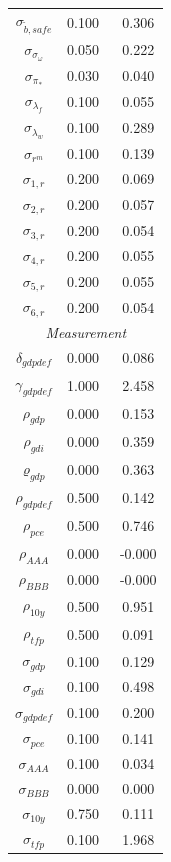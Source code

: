 \documentclass[12pt]{article}
\begin{document}
\begin{longtable}{ccc}
$ \sigma_{\tilde{b}, safe}$ &    0.100 & \   0.306 \\
$ \sigma_{\sigma_\omega}$ &    0.050 & \   0.222 \\
$ \sigma_{\pi_*}$ &    0.030 & \   0.040 \\
$ \sigma_{\lambda_f}$ &    0.100 & \   0.055 \\
$ \sigma_{\lambda_w}$ &    0.100 & \   0.289 \\
$ \sigma_{r^m}$ &    0.100 & \   0.139 \\
$ \sigma_{1,r}$ &    0.200 & \   0.069 \\
$ \sigma_{2,r}$ &    0.200 & \   0.057 \\
$ \sigma_{3,r}$ &    0.200 & \   0.054 \\
$ \sigma_{4,r}$ &    0.200 & \   0.055 \\
$ \sigma_{5,r}$ &    0.200 & \   0.055 \\
$ \sigma_{6,r}$ &    0.200 & \   0.054 \\
\multicolumn{7}{c}{\textit{Measurement}} \\[3pt]
$ \delta_{gdpdef}$ &    0.000 & \   0.086 \\
$ \gamma_{gdpdef}$ &    1.000 & \   2.458 \\
$ \rho_{gdp}$ &    0.000 & \   0.153 \\
$ \rho_{gdi}$ &    0.000 & \   0.359 \\
$ \varrho_{gdp}$ &    0.000 & \   0.363 \\
$ \rho_{gdpdef}$ &    0.500 & \   0.142 \\
$ \rho_{pce}$ &    0.500 & \   0.746 \\
$ \rho_{AAA}$ &    0.000 & \  -0.000 \\
$ \rho_{BBB}$ &    0.000 & \  -0.000 \\
$ \rho_{10y}$ &    0.500 & \   0.951 \\
$ \rho_{tfp}$ &    0.500 & \   0.091 \\
$ \sigma_{gdp}$ &    0.100 & \   0.129 \\
$ \sigma_{gdi}$ &    0.100 & \   0.498 \\
$ \sigma_{gdpdef}$ &    0.100 & \   0.200 \\
$ \sigma_{pce}$ &    0.100 & \   0.141 \\
$ \sigma_{AAA}$ &    0.100 & \   0.034 \\
$ \sigma_{BBB}$ &    0.000 & \   0.000 \\
$ \sigma_{10y}$ &    0.750 & \   0.111 \\
$ \sigma_{tfp}$ &    0.100 & \   1.968 \\
\end{longtable}
\end{document}
